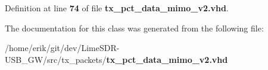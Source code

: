Definition at line {\bf 74} of file {\bf tx\+\_\+pct\+\_\+data\+\_\+mimo\+\_\+v2.\+vhd}.



The documentation for this class was generated from the following file\+:\begin{DoxyCompactItemize}
\item 
/home/erik/git/dev/\+Lime\+S\+D\+R-\/\+U\+S\+B\+\_\+\+G\+W/src/tx\+\_\+packets/{\bf tx\+\_\+pct\+\_\+data\+\_\+mimo\+\_\+v2.\+vhd}\end{DoxyCompactItemize}
